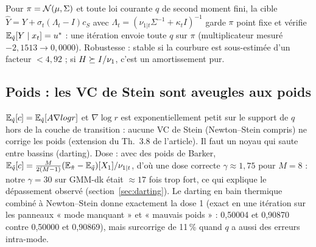 \begin{theorem}
Pour $\pi=\mathcal{N}(\mu,\Sigma)$ et toute loi courante $q$ de second moment fini, la cible $\hat Y=Y+\sigma_t(\Lambda_t-I)c_S$ avec $\Lambda_t=(\nu_{1|t}\Sigma^{-1}+\kappa_tI)^{-1}$ garde $\pi$ point fixe et vérifie $\mathbb{E}_{\tilde q}[Y\mid x_t]=u^*$ : une itération envoie toute $q$ sur $\pi$ (multiplicateur mesuré $-2{,}1513\to0{,}0000$). Robustesse : stable si la courbure est sous-estimée d'un facteur $<4{,}92$ ; si $H\succeq I/\nu_{1}$, c'est un amortissement pur.
\end{theorem}

\subsection{Poids : les VC de Stein sont aveugles aux poids}
$\mathbb{E}_{\tilde q}[c]=\mathbb{E}_{\tilde q}[A\nabla log r]$ et $\nabla\log r$ est exponentiellement petit sur le support de $q$ hors de la couche de transition : aucune VC de Stein (Newton--Stein compris) ne corrige les poids (extension du Th.~3.8 de l'article). Il faut un noyau qui saute entre bassins (darting). Dose : avec des poids de Barker, $\mathbb{E}_{\tilde q}[c]=\frac{M}{2(M-1)}(\mathbb{E}_{\tilde\pi}-\mathbb{E}_{\tilde q})[X_1]/\nu_{1|t}$, d'où une dose correcte $\gamma\approx1{,}75$ pour $M=8$ : notre $\gamma=30$ sur GMM-dk était $\approx17$ fois trop fort, ce qui explique le dépassement observé (section~\ref{sec:darting}). Le darting en bain thermique combiné à Newton--Stein donne exactement la dose 1 (exact en une itération sur les panneaux « mode manquant » et « mauvais poids » : 0,50004 et 0,90870 contre 0,50000 et 0,90869), mais surcorrige de 11\,\% quand $q$ a aussi des erreurs intra-mode.

